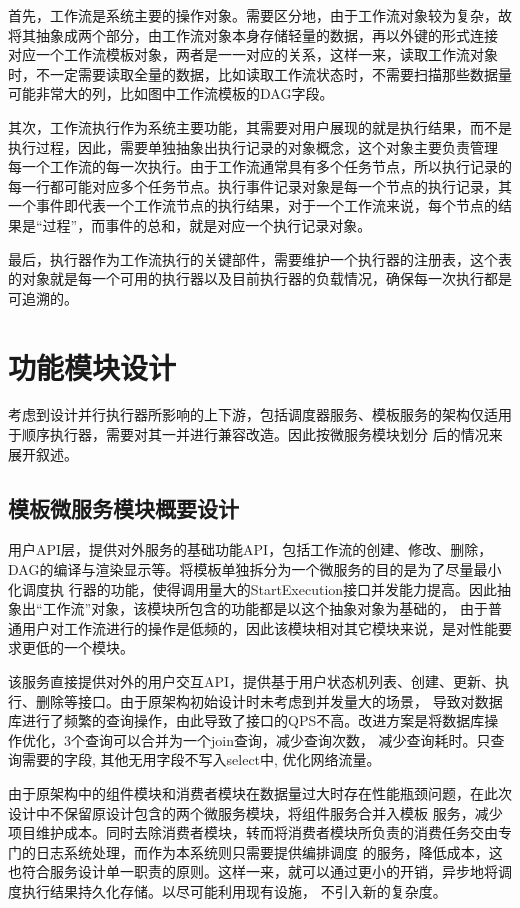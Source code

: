 首先，工作流是系统主要的操作对象。需要区分地，由于工作流对象较为复杂，故将其抽象成两个部分，由工作流对象本身存储轻量的数据，再以外键的形式连接
对应一个工作流模板对象，两者是一一对应的关系，这样一来，读取工作流对象时，不一定需要读取全量的数据，比如读取工作流状态时，不需要扫描那些数据量
可能非常大的列，比如图中工作流模板的DAG字段。

其次，工作流执行作为系统主要功能，其需要对用户展现的就是执行结果，而不是执行过程，因此，需要单独抽象出执行记录的对象概念，这个对象主要负责管理
每一个工作流的每一次执行。由于工作流通常具有多个任务节点，所以执行记录的每一行都可能对应多个任务节点。执行事件记录对象是每一个节点的执行记录，其
一个事件即代表一个工作流节点的执行结果，对于一个工作流来说，每个节点的结果是“过程”，而事件的总和，就是对应一个执行记录对象。

最后，执行器作为工作流执行的关键部件，需要维护一个执行器的注册表，这个表的对象就是每一个可用的执行器以及目前执行器的负载情况，确保每一次执行都是
可追溯的。

\section{功能模块设计}
考虑到设计并行执行器所影响的上下游，包括调度器服务、模板服务的架构仅适用于顺序执行器，需要对其一并进行兼容改造。因此按微服务模块划分
后的情况来展开叙述。


\subsection{模板微服务模块概要设计}

用户API层，提供对外服务的基础功能API，包括工作流的创建、修改、删除，DAG的编译与渲染显示等。将模板单独拆分为一个微服务的目的是为了尽量最小化调度执
行器的功能，使得调用量大的StartExecution接口并发能力提高。因此抽象出“工作流”对象，该模块所包含的功能都是以这个抽象对象为基础的，
由于普通用户对工作流进行的操作是低频的，因此该模块相对其它模块来说，是对性能要求更低的一个模块。

该服务直接提供对外的用户交互API，提供基于用户状态机列表、创建、更新、执行、删除等接口。由于原架构初始设计时未考虑到并发量大的场景，
导致对数据库进行了频繁的查询操作，由此导致了接口的QPS不高。改进方案是将数据库操作优化，3个查询可以合并为一个join查询，减少查询次数，
减少查询耗时。只查询需要的字段, 其他无用字段不写入select中, 优化网络流量。

由于原架构中的组件模块和消费者模块在数据量过大时存在性能瓶颈问题，在此次设计中不保留原设计包含的两个微服务模块，将组件服务合并入模板
服务，减少项目维护成本。同时去除消费者模块，转而将消费者模块所负责的消费任务交由专门的日志系统处理，而作为本系统则只需要提供编排调度
的服务，降低成本，这也符合服务设计单一职责的原则。这样一来，就可以通过更小的开销，异步地将调度执行结果持久化存储。以尽可能利用现有设施，
不引入新的复杂度。

